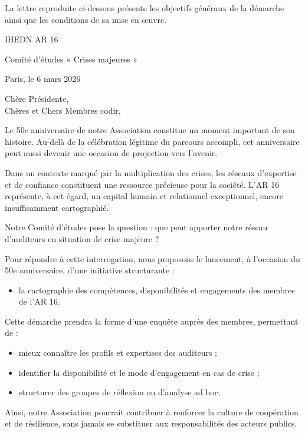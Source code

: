 La lettre reproduite ci-dessous présente les objectifs généraux de la
démarche ainsi que les conditions de sa mise en œuvre.

\begin{tcolorbox}[
breakable,
colback=gray!5,
colframe=black,
boxrule=0.5pt,
arc=3mm
]
\setlength{\parskip}{0.5em}
IHEDN AR 16

Comité d'études « Crises majeures »

\hfill Paris, le 6 mars 2026

Chère Présidente,\\
Chères et Chers Membres \acrshort{codir},

Le 50e anniversaire de notre Association constitue un moment important de son histoire. Au-delà de la célébration légitime du parcours accompli, cet anniversaire peut aussi devenir une occasion de projection vers l'avenir.

Dans un contexte marqué par la multiplication des crises, les réseaux d'expertise et de confiance constituent une ressource précieuse pour la société. L'AR 16 représente, à cet égard, un capital humain et relationnel exceptionnel, encore insuffisamment cartographié.

Notre Comité d'études pose la question : que peut apporter notre réseau d'auditeurs en situation de crise majeure ?

Pour répondre à cette interrogation, nous proposons le lancement, à l'occasion du 50e anniversaire, d'une initiative structurante :

\begin{itemize}
    \item la cartographie des compétences, disponibilités et engagements des membres de l'AR 16.
\end{itemize}

Cette démarche prendra la forme d'une enquête auprès des membres, permettant de :

\begin{itemize}
    \item mieux connaître les profils et expertises des auditeurs ;
    \item identifier la disponibilité et le mode d'engagement en cas de crise ;
    \item structurer des groupes de réflexion ou d'analyse ad hoc.
\end{itemize}

Ainsi, notre Association pourrait contribuer à renforcer la culture de coopération et de résilience, sans jamais se substituer aux responsabilités des acteurs publics.


\end{tcolorbox}
